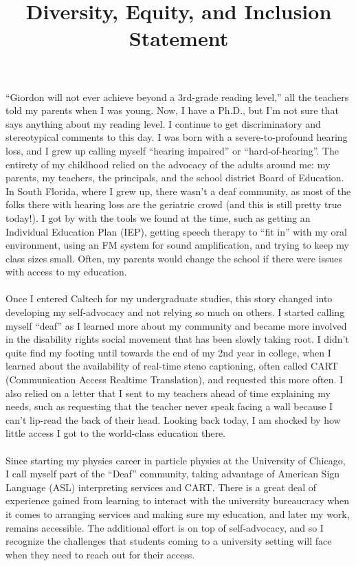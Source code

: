\documentclass[10pt,a4paper,sans]{moderncv/moderncv} %
\title{Diversity, Equity, and Inclusion Statement}
\begin{document}
\renewcommand*{\bibliographyhead}[1]{\section{#1}}
\makecvtitle %

``Giordon will not ever achieve beyond a 3rd-grade reading level,'' all the teachers told my parents when I was young. Now, I have a Ph.D., but I'm not sure that says anything about my reading level. I continue to get discriminatory and stereotypical comments to this day. I was born with a severe-to-profound hearing loss, and I grew up calling myself ``hearing impaired'' or ``hard-of-hearing''. The entirety of my childhood relied on the advocacy of the adults around me: my parents, my teachers, the principals, and the school district Board of Education. In South Florida, where I grew up, there wasn't a deaf community, as most of the folks there with hearing loss are the geriatric crowd (and this is still pretty true today!). I got by with the tools we found at the time, such as getting an Individual Education Plan (IEP), getting speech therapy to ``fit in'' with my oral environment, using an FM system for sound amplification, and trying to keep my class sizes small. Often, my parents would change the school if there were issues with access to my education.
\\
\\
Once I entered Caltech for my undergraduate studies, this story changed into developing my self-advocacy and not relying so much on others. I started calling myself ``deaf'' as I learned more about my community and became more involved in the disability rights social movement that has been slowly taking root. I didn't quite find my footing until towards the end of my 2nd year in college, when I learned about the availability of real-time steno captioning, often called CART (Communication Access Realtime Translation), and requested this more often. I also relied on a letter that I sent to my teachers ahead of time explaining my needs, such as requesting that the teacher never speak facing a wall because I can't lip-read the back of their head. Looking back today, I am shocked by how little access I got to the world-class education there.
\\
\\
Since starting my physics career in particle physics at the University of Chicago, I call myself part of the ``Deaf'' community, taking advantage of American Sign Language (ASL) interpreting services and CART. There is a great deal of experience gained from learning to interact with the university bureaucracy when it comes to arranging services and making sure my education, and later my work, remains accessible. The additional effort is on top of self-advocacy, and so I recognize the challenges that students coming to a university setting will face when they need to reach out for their access.
\end{document}
